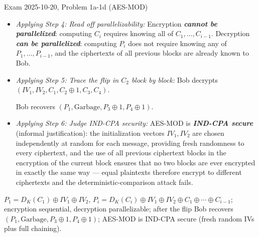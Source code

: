 \documentclass[12pt, a4paper]{article}
\newcommand{\term}[1]{\textbf{\textit{#1}}}        %
\begin{document}
\begin{practicebox}{Exam 2025-10-20, Problem 1a-1d (AES-MOD)}
\begin{itemize}
The special case is $P_1 = D_K(C_1) \oplus IV_1 \oplus IV_2$.
    \item \textit{Applying Step 4: Read off parallelizability:} Encryption \term{cannot be parallelized}: computing $C_i$ requires knowing all of $C_1, \dots, C_{i-1}$. Decryption \term{can be parallelized}: computing $P_i$ does not require knowing any of $P_1, \dots, P_{i-1}$, and the ciphertexts of all previous blocks are already known to Bob.
    \item \textit{Applying Step 5: Trace the flip in $C_2$ block by block:} Bob decrypts $(IV_1, IV_2, C_1, C_2 \oplus 1, C_3, C_4)$.
    Bob recovers $(P_1, \text{Garbage}, P_3 \oplus 1, P_4 \oplus 1)$.
    \item \textit{Applying Step 6: Judge IND-CPA security:} AES-MOD is \term{IND-CPA secure} (informal justification): the initialization vectors $IV_1, IV_2$ are chosen independently at random for each message, providing fresh randomness to every ciphertext, and the use of all previous ciphertext blocks in the encryption of the current block ensures that no two blocks are ever encrypted in exactly the same way --- equal plaintexts therefore encrypt to different ciphertexts and the deterministic-comparison attack fails.
\end{itemize}

\begin{answerbox}
$P_1 = D_K(C_1) \oplus IV_1 \oplus IV_2$, $P_i = D_K(C_i) \oplus IV_1 \oplus IV_2 \oplus C_1 \oplus \cdots \oplus C_{i-1}$; encryption sequential, decryption parallelizable; after the flip Bob recovers $(P_1, \text{Garbage}, P_3 \oplus 1, P_4 \oplus 1)$; AES-MOD is IND-CPA secure (fresh random IVs plus full chaining).
\end{answerbox}
\end{practicebox}
\end{document}
